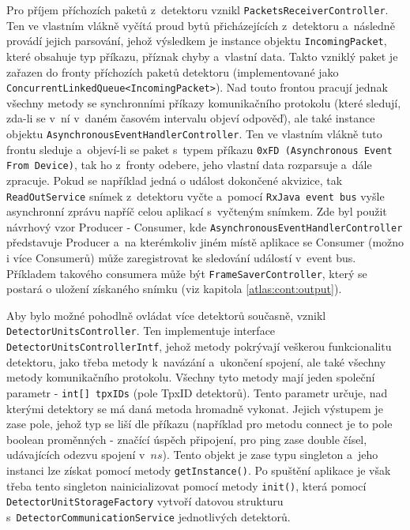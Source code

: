 Pro příjem příchozích paketů z~detektoru vznikl \texttt{PacketsReceiverController}. Ten ve vlastním vlákně vyčítá proud bytů přicházejících z~detektoru a~následně provádí jejich parsování, jehož výsledkem je instance objektu \texttt{IncomingPacket}, které obsahuje typ příkazu, příznak chyby a~vlastní data. Takto vzniklý paket je zařazen do fronty příchozích paketů detektoru (implementované jako \texttt{ConcurrentLinkedQueue<IncomingPacket>}). Nad touto frontou pracují jednak všechny metody se synchronními příkazy komunikačního protokolu (které sledují, zda-li se v~ní v~daném časovém intervalu objeví odpověď), ale také instance objektu \texttt{AsynchronousEventHandlerController}. Ten ve vlastním vlákně tuto frontu sleduje a~objeví-li se paket s~typem příkazu \texttt{0xFD (Asynchronous Event From Device)}, tak ho z~fronty odebere, jeho vlastní data rozparsuje a~dále zpracuje. Pokud se například jedná o událost dokončené akvizice, tak \texttt{ReadOutService} snímek z~detektoru vyčte a~pomocí \texttt{RxJava event bus} vyšle asynchronní zprávu napříč celou aplikací s~vyčteným snímkem. Zde byl použit návrhový vzor Producer - Consumer, kde \texttt{AsynchronousEventHandlerController} představuje Producer a~na kterémkoliv jiném místě aplikace se Consumer (možno i více Consumerů) může zaregistrovat ke sledování událostí v~event bus. Příkladem takového consumera může být \texttt{FrameSaverController}, který se postará o uložení získaného snímku (viz kapitola \ref{atlas:cont:output}).

Aby bylo možné pohodlně ovládat více detektorů současně, vznikl\\\texttt{DetectorUnitsController}. Ten implementuje interface \texttt{DetectorUnitsControllerIntf}, jehož metody pokrývají veškerou funkcionalitu detektoru, jako třeba metody k~navázání a~ukončení spojení, ale také všechny metody komunikačního protokolu. Všechny tyto metody mají jeden společní parametr - \texttt{int[] tpxIDs} (pole TpxID detektorů). Tento parametr určuje, nad kterými detektory se má daná metoda hromadně vykonat. Jejich výstupem je zase pole, jehož typ se liší dle příkazu (například pro metodu connect je to pole boolean proměnných - značící úspěch připojení, pro ping zase double čísel, udávajících odezvu spojení v~$ns$). Tento objekt je zase typu singleton a~jeho instanci lze získat pomocí metody \texttt{getInstance()}. Po spuštění aplikace je však třeba tento singleton nainicializovat pomocí metody \texttt{init()}, která pomocí \texttt{DetectorUnitStorageFactory} vytvoří datovou strukturu  s~\texttt{DetectorCommunicationService} jednotlivých detektorů.


